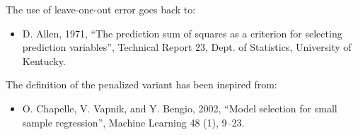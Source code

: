             {
              The use of leave-one-out error goes back to:
              \begin{itemize}
              \item D. Allen, 1971, ``The prediction sum of squares as a criterion for selecting prediction variables'', Technical Report 23, Dept. of Statistics, University of Kentucky.
              \end{itemize}
              The definition of the penalized variant has been inspired from:
              \begin{itemize}
              \item O. Chapelle, V. Vapnik, and Y. Bengio, 2002, ``Model selection for small sample regression'', Machine Learning 48 (1), 9--23.
              \end{itemize}
            }
